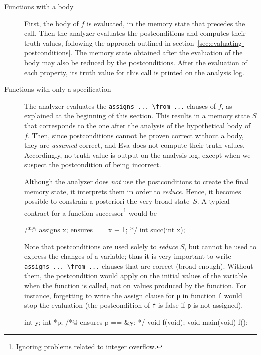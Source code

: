 \documentclass[web]{frama-c-book}
\newcommand{\Eva}{\textsf{Eva}}
\begin{document}
\begin{description}
\item [Functions with a body]

  First, the body of $f$ is evaluated, in the memory state that
  precedes the call. Then the analyzer evaluates the postconditions
  and computes their truth values, following the approach outlined in
  section~\ref{sec:evaluating-postconditions}. The memory state
  obtained after the evaluation of the body may also be reduced by the
  postconditions. After the evaluation of each property, its truth
  value for this call is printed on the analysis log.

\item [Functions with only a specification] The analyzer evaluates the
  \lstinline|assigns ... \from ...| clauses of $f$, as explained at
  the beginning of this section. This results in a memory state $S$ that
  corresponds to the one after the analysis of the hypothetical body
  of~$f$.
%
  Then, since postconditions cannot be proven correct without a
  body, they are \emph{assumed} correct, and \Eva{} does not
  compute their truth values.  Accordingly, no truth value is output on the
  analysis log, except when we suspect the postcondition of being
  incorrect.

  Although the analyzer does \emph{not} use the postconditions to
  create the final memory state, it interprets them in order to
  \emph{reduce}.  Hence, it becomes possible to constrain a posteriori
  the very broad state~$S$.  A typical contract for a function
  successor\footnote{Ignoring problems related to integer overflow.} would be
\begin{listing}{1}
/*@ assigns \result \from x;
    ensures \result == x + 1; */
int succ(int x);
\end{listing}

  Note that postconditions are used solely to \emph{reduce} $S$, but
  cannot be used to express the changes of a variable; thus it is very
  important to write \lstinline|assigns ... \from ...|
  clauses that are correct (broad enough).
  Without them, the postcondition would apply on the initial values of the
  variable when the function is called, not on values produced by the function.
  For instance, forgetting to
  write the assign clause for \lstinline|p| in function \lstinline|f|
  would stop the evaluation (the postcondition of \lstinline|f| is
  false if \lstinline|p| is not assigned).

  \begin{listing}{1}
    int y; int *p;
    /*@ ensures p == &y; */
    void f(void);
    void main(void){ f(); }
  \end{listing}


\end{description}
\end{document}
